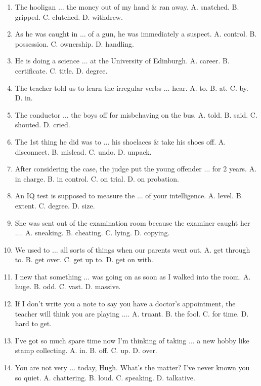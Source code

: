 \documentclass{article}
\numberwithin{equation}{section}
\begin{document}
\begin{enumerate}[leftmargin=8mm]
	\item The hooligan $\ldots$ the money out of my hand \& ran away. {\sf A.} snatched. {\sf B.} gripped. {\sf C.} clutched. {\sf D.} withdrew.
	\item As he was caught in $\ldots$ of a gun, he was immediately a suspect. {\sf A.} control. {\sf B.} possession. {\sf C.} ownership. {\sf D.} handling.
	\item He is doing a science $\ldots$ at the University of Edinburgh. {\sf A.} career. {\sf B.} certificate. {\sf C.} title. {\sf D.} degree.
	\item The teacher told us to learn the irregular verbs $\ldots$ hear. {\sf A.} to. {\sf B.} at. {\sf C.} by. {\sf D.} in.
	\item The conductor $\ldots$ the boys off for misbehaving on the bus. {\sf A.} told. {\sf B.} said. {\sf C.} shouted. {\sf D.} cried.
	\item The 1st thing he did was to $\ldots$ his shoelaces \& take his shoes off. {\sf A.} disconnect. {\sf B.} mislead. {\sf C.} undo. {\sf D.} unpack.
	\item After considering the case, the judge put the young offender $\ldots$ for 2 years. {\sf A.} in charge. {\sf B.} in control. {\sf C.} on trial. {\sf D.} on probation.
	\item An IQ test is supposed to measure the $\ldots$ of your intelligence. {\sf A.} level. {\sf B.} extent. {\sf C.} degree. {\sf D.} size.
	\item She was sent out of the examination room because the examiner caught her $\ldots$. {\sf A.} sneaking. {\sf B.} cheating. {\sf C.} lying. {\sf D.} copying.
	\item We used to $\ldots$ all sorts of things when our parents went out. {\sf A.} get through to. {\sf B.} get over. {\sf C.} get up to. {\sf D.} get on with.
	\item I new that something $\ldots$ was going on as soon as I walked into the room. {\sf A.} huge. {\sf B.} odd. {\sf C.} vast. {\sf D.} massive.
	\item If I don't write you a note to say you have a doctor's appointment, the teacher will think you are playing $\ldots$. {\sf A.} truant. {\sf B.} the fool. {\sf C.} for time. {\sf D.} hard to get.
	\item I've got so much spare time now I'm thinking of taking $\ldots$ a new hobby like stamp collecting. {\sf A.} in. {\sf B.} off. {\sf C.} up. {\sf D.} over.
	\item You are not very $\ldots$ today, Hugh. What's the matter? I've never known you so quiet. {\sf A.} chattering. {\sf B.} loud. {\sf C.} speaking. {\sf D.} talkative.

\end{enumerate}
\end{document}
